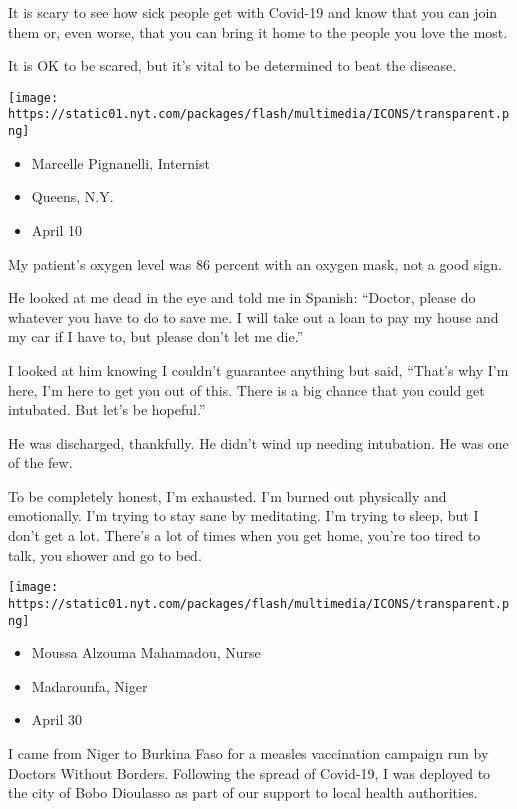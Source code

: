 It is scary to see how sick people get with Covid-19 and know that you
can join them or, even worse, that you can bring it home to the people
you love the most.

It is OK to be scared, but it's vital to be determined to beat the
disease.

\texttt{[image: https://static01.nyt.com/packages/flash/multimedia/ICONS/transparent.png]}

\begin{itemize}
\tightlist
\item
  Marcelle Pignanelli, Internist
\item
  Queens, N.Y.
\item
  April 10
\end{itemize}

My patient's oxygen level was 86 percent with an oxygen mask, not a good
sign.

He looked at me dead in the eye and told me in Spanish: ``Doctor, please
do whatever you have to do to save me. I will take out a loan to pay my
house and my car if I have to, but please don't let me die.''

I looked at him knowing I couldn't guarantee anything but said, ``That's
why I'm here, I'm here to get you out of this. There is a big chance
that you could get intubated. But let's be hopeful.''

He was discharged, thankfully. He didn't wind up needing intubation. He
was one of the few.

To be completely honest, I'm exhausted. I'm burned out physically and
emotionally. I'm trying to stay sane by meditating. I'm trying to sleep,
but I don't get a lot. There's a lot of times when you get home, you're
too tired to talk, you shower and go to bed.

\texttt{[image: https://static01.nyt.com/packages/flash/multimedia/ICONS/transparent.png]}

\begin{itemize}
\tightlist
\item
  Moussa Alzouma Mahamadou, Nurse
\item
  Madarounfa, Niger
\item
  April 30
\end{itemize}

I came from Niger to Burkina Faso for a measles vaccination campaign run
by Doctors Without Borders. Following the spread of Covid-19, I was
deployed to the city of Bobo Dioulasso as part of our support to local
health authorities.

